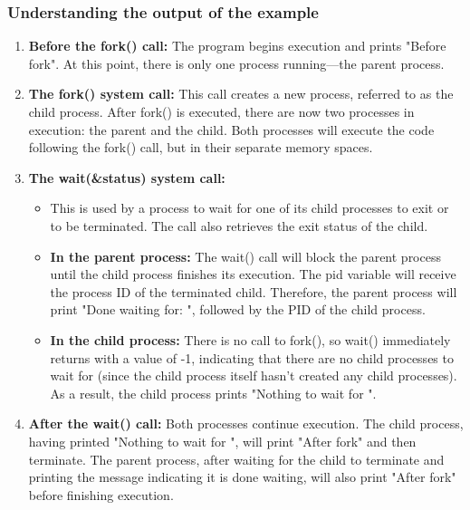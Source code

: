 \documentclass{report}
\begin{document}
        \bigbreak \noindent 
        \subsubsection{Understanding the output of the example}
        \bigbreak \noindent 
        \begin{enumerate}
            \item \textbf{Before the fork() call:} The program begins execution and prints "Before fork". At this point, there is only one process running—the parent process.
            \item \textbf{The fork() system call:} This call creates a new process, referred to as the child process. After fork() is executed, there are now two processes in execution: the parent and the child. Both processes will execute the code following the fork() call, but in their separate memory spaces.

            \item \textbf{The wait(&status) system call:}
                \begin{itemize}
                    \item This is used by a process to wait for one of its child processes to exit or to be terminated. The call also retrieves the exit status of the child.
                    \item \textbf{In the parent process:} The wait() call will block the parent process until the child process finishes its execution. The pid variable will receive the process ID of the terminated child. Therefore, the parent process will print "Done waiting for: ", followed by the PID of the child process.
                    \item \textbf{In the child process:} There is no call to fork(), so wait() immediately returns with a value of -1, indicating that there are no child processes to wait for (since the child process itself hasn't created any child processes). As a result, the child process prints "Nothing to wait for \n".
                \end{itemize}
            \item \textbf{After the wait() call:} Both processes continue execution. The child process, having printed "Nothing to wait for \n", will print "After fork\n" and then terminate. The parent process, after waiting for the child to terminate and printing the message indicating it is done waiting, will also print "After fork\n" before finishing execution.
        \end{enumerate}
\end{document}
